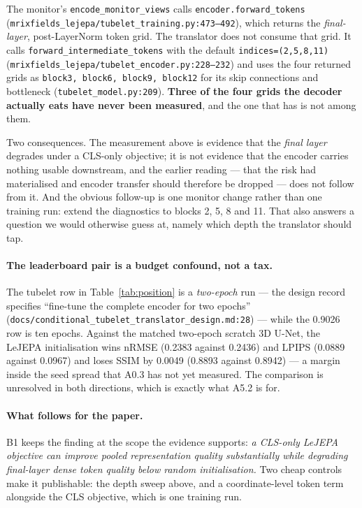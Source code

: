 \documentclass[11pt,a4paper]{article}
\newcommand{\rmse}{nRMSE}
\begin{document}
The monitor's \texttt{encode\_monitor\_views} calls \texttt{encoder.forward\_tokens}
(\texttt{mrixfields\_lejepa/\allowbreak tubelet\_training.py:473--492}), which returns the \emph{final-layer},
post-LayerNorm token grid. The translator does not consume that grid. It calls
\texttt{forward\_intermediate\_tokens} with the default \texttt{indices=(2,5,8,11)}
(\texttt{mrixfields\_lejepa/\allowbreak tubelet\_encoder.py:228--232}) and uses the four returned grids as
\texttt{block3, block6, block9, block12} for its skip connections and bottleneck
(\texttt{tubelet\_model.py:209}). \textbf{Three of the four grids the decoder actually eats have never
been measured}, and the one that has is not among them.

Two consequences. The measurement above is evidence that the \emph{final layer} degrades under a
CLS-only objective; it is not evidence that the encoder carries nothing usable downstream, and the
earlier reading --- that the risk had materialised and encoder transfer should therefore be dropped ---
does not follow from it. And the obvious follow-up is one monitor change rather than one training run:
extend the diagnostics to blocks 2, 5, 8 and 11. That also answers a question we would otherwise guess
at, namely which depth the translator should tap.

\paragraph{The leaderboard pair is a budget confound, not a tax.} The tubelet row in
Table~\ref{tab:position} is a \emph{two-epoch} run --- the design record specifies ``fine-tune the
complete encoder for two epochs'' (\texttt{docs/conditional\_tubelet\_translator\_design.md:28}) ---
while the \num{0.9026} row is ten epochs. Against the matched two-epoch scratch 3D U-Net, the LeJEPA
initialisation wins \rmse{} (\num{0.2383} against \num{0.2436}) and LPIPS (\num{0.0889} against
\num{0.0967}) and loses SSIM by \num{0.0049} (\num{0.8893} against \num{0.8942}) --- a margin inside the
seed spread that A0.3 has not yet measured. The comparison is unresolved in both directions, which is
exactly what A5.2 is for.

\paragraph{What follows for the paper.} B1 keeps the finding at the scope the evidence supports:
\emph{a CLS-only LeJEPA objective can improve pooled representation quality substantially while
degrading final-layer dense token quality below random initialisation.} Two cheap controls make it
publishable: the depth sweep above, and a coordinate-level token term alongside the CLS objective, which
is one training run.
\end{document}
